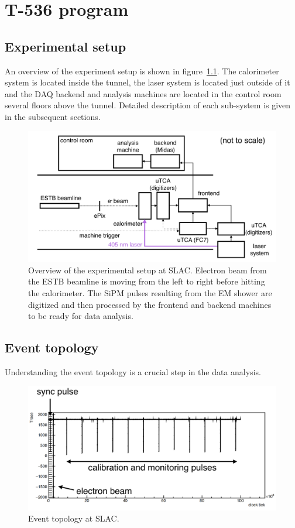 \chapter{T-536 program}
\label{chap:program}

\section{Experimental setup}

An overview of the experiment setup is shown in figure~\ref{fig:overview}.
%
The calorimeter system is located inside the tunnel,
the laser system is located just outside of it and 
the DAQ backend and analysis machines are located in the control room
several floors above the tunnel.
%
Detailed description of each sub-system is given in the subsequent sections. 
%
\begin{figure}[htbp]
\centering
\includegraphics[width=.85\textwidth]{pics/SLACoverview}
\caption{Overview of the experimental setup at SLAC. 
Electron beam from the ESTB beamline is moving from
the left to right before hitting the calorimeter.
The SiPM pulses resulting from the EM shower are digitized and
then processed by the frontend and backend machines to be ready for data analysis.
}\label{fig:overview}
\end{figure}

\section{Event topology}

Understanding the event topology is a crucial step in the data analysis.

\begin{figure}[htbp]
\centering
\includegraphics[width=.8\textwidth]{pics/eventtopology}
\caption{\label{fig:eventtopology} Event topology at SLAC.}
\end{figure}


